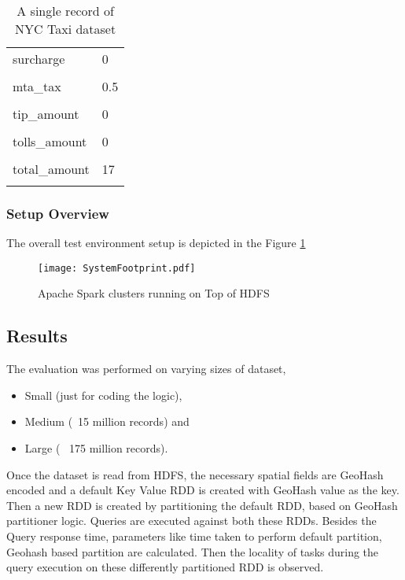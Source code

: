 \documentclass[article,type=msc,colorback,12pt,accentcolor=tud1d]{tudthesis}
\begin{document}
\begin{table}[h]
\begin{tabular}{ll}
		  		    		surcharge & 0     \\ \\[-1em]
		  		    		mta\_tax & 0.5     \\ \\[-1em]
		  		    		tip\_amount & 0     \\ \\[-1em]
		  		    		tolls\_amount & 0     \\ \\[-1em]
		  		    		total\_amount & 17     \\ \\[-1em] 
		  		    	\end{tabular}
		  		    	\caption{A single record of NYC Taxi dataset}
		  		    	\label{nyctaxidatarec}
		  		    \end{table}
			  
			  
			  
		  \clearpage
		  
		  \subsubsection{Setup Overview}
		  
		  The overall test environment setup is depicted in the Figure \ref{fig:system-footprint}
		  
				\begin{figure}[h]
				\centering
				\texttt{[image: SystemFootprint.pdf]}
				\caption{Apache Spark clusters running on Top of HDFS}
				\label{fig:system-footprint}
				\end{figure}
		  
		  
		  \hfill
		  \clearpage
		  \subsection{Results}
		  
		   The evaluation was performed on varying sizes of dataset, 
		   \begin{itemize}
		   	\item Small (just for coding the logic), 
		   \item Medium (~15 million records) and 
		   \item Large (~ 175 million records). 
		   \end{itemize}
		  Once the dataset is read from HDFS, the necessary spatial fields are GeoHash encoded and a default Key Value RDD is created with GeoHash value as the key. Then a new RDD is created by partitioning the default RDD, based on GeoHash partitioner logic. Queries are executed against both these RDDs. Besides the Query response time, parameters like time taken to perform default partition, Geohash based partition are calculated. Then the locality of tasks during the query execution on these differently partitioned RDD is observed.
		  
\end{document}
